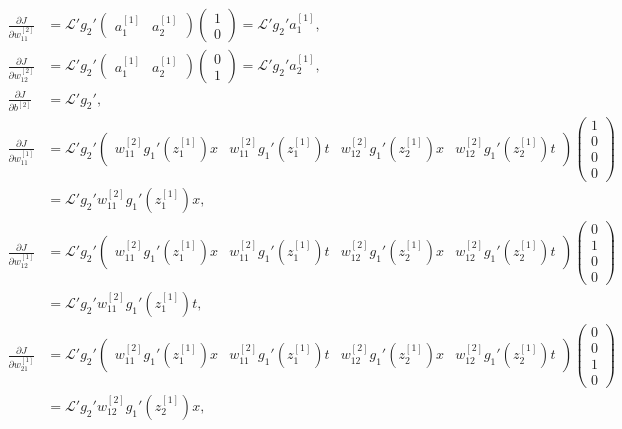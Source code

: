 \documentclass{article}
\begin{document}
\begin{align}
\label{dJdw2mat_fw2}
\frac{\partial J}{\partial w_{11}^{[2]}} &= 
\mathcal{L}'
g_2'
\begin{pmatrix}
a_1^{[1]} & a_2^{[1]} 
\end{pmatrix}
\begin{pmatrix}
1 \\ 0 
\end{pmatrix} = \mathcal{L}'
g_2' a_1^{[1]},  \\
\frac{\partial J}{\partial w_{12}^{[2]}} &= 
\mathcal{L}'
g_2'
\begin{pmatrix}
a_1^{[1]} & a_2^{[1]} 
\end{pmatrix}
\begin{pmatrix}
0 \\ 1 
\end{pmatrix} = \mathcal{L}'
g_2' a_2^{[1]}, \\
\label{db2_grad}
\frac{\partial J}{\partial b^{[2]}} &=
\mathcal{L}'
g_2',\\
\frac{\partial J}{\partial w_{11}^{[1]}} &= 
\mathcal{L}'
g_2'
\begin{pmatrix}
w_{11}^{[2]}  g_1'(z_1^{[1]}) x & w_{11}^{[2]} g_1'(z_1^{[1]}) t & w_{12}^{[2]} g_1'(z_2^{[1]}) x &  w_{12}^{[2]} g_1'(z_2^{[1]}) t
\end{pmatrix}
\begin{pmatrix}
1 \\
0 \\
0 \\
0
\end{pmatrix} \nonumber \\
&= 
\mathcal{L}'
g_2'
w_{11}^{[2]}  g_1'(z_1^{[1]}) x, 
\label{dJdw1mat_fw2}
\\ 
\frac{\partial J}{\partial w_{12}^{[1]}} &= 
\mathcal{L}'
g_2'
\begin{pmatrix}
w_{11}^{[2]}  g_1'(z_1^{[1]}) x & w_{11}^{[2]} g_1'(z_1^{[1]}) t & w_{12}^{[2]} g_1'(z_2^{[1]}) x &  w_{12}^{[2]} g_1'(z_2^{[1]}) t
\end{pmatrix}
\begin{pmatrix}
0 \\
1 \\
0 \\
0
\end{pmatrix} \nonumber \\
&= 
\mathcal{L}'
g_2'
w_{11}^{[2]} g_1'(z_1^{[1]}) t, \\
\frac{\partial J}{\partial w_{21}^{[1]}} &= 
\mathcal{L}'
g_2'
\begin{pmatrix}
w_{11}^{[2]}  g_1'(z_1^{[1]}) x & w_{11}^{[2]} g_1'(z_1^{[1]}) t & w_{12}^{[2]} g_1'(z_2^{[1]}) x &  w_{12}^{[2]} g_1'(z_2^{[1]}) t
\end{pmatrix}
\begin{pmatrix}
0 \\
0 \\
1 \\
0
\end{pmatrix} \nonumber \\
&= 
\mathcal{L}'
g_2'
w_{12}^{[2]} g_1'(z_2^{[1]}) x,
\end{align}
\end{document}
